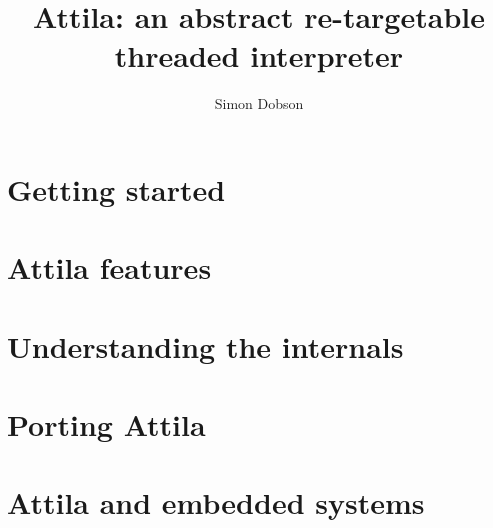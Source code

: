 \documentclass{book}
\title{Attila: an abstract re-targetable threaded interpreter}
\author{Simon Dobson}
\begin{document}
\maketitle





\part{Getting started}
\label{part:getting-started}

%


\part{Attila features}
\label{part:features}

%

%
%

%
%
%
%
%
%
%
%
%
%
%
%
%
%
%
 

\part{Understanding the internals}
\label{part:internals}

%
%
%


\part{Porting Attila}
\label{part:porting}




\part{Attila and embedded systems}
\label{part:embedded-systems}





\end{document}
